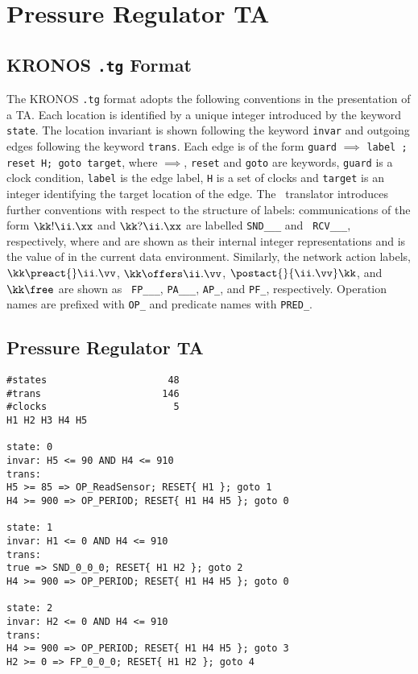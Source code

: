 \twocolumn
\chapter{Pressure Regulator TA}\label{app:pressureta}
{
\tiny
\section{KRONOS {\tt .tg} Format}
The KRONOS {\tt .tg} format adopts the following conventions in the
presentation of a TA. Each location is identified by a unique integer
introduced by the keyword {\tt state}. The location invariant is shown
following the keyword {\tt invar} and outgoing edges following the
keyword {\tt trans}. Each edge is of the form {\tt guard} $\implies$
{\tt label ; reset H; goto target}, where $\implies$, {\tt reset} and
{\tt goto} are keywords, {\tt guard} is a clock condition, {\tt label}
is the edge label, {\tt H} is a set of clocks and {\tt target} is an
integer identifying the target location of the edge. The \bcandle\
translator introduces further conventions with respect to the
structure of labels: communications of the form $\kk!\ii.\xx$ and
$\kk?\ii.\xx$ are labelled {\tt SND\_\kk\_\ii\_\vv} and {\tt
RCV\_\kk\_\ii\_\vv}, respectively, where {\tt \kk} and {\tt \ii} are
shown as their internal integer representations and {\tt \vv} is the
value of {\tt \xx} in the current data environment. Similarly, the
network action labels, $\kk\preact{}\ii.\vv$, $\kk\offers\ii.\vv$,
$\postact{}{\ii.\vv}\kk$, and $\kk\free$ are shown as {\tt
FP\_\kk\_\ii\_\vv}, {\tt PA\_\kk\_\ii\_\vv}, {\tt AP\_\kk},
and {\tt PF\_\kk}, respectively. Operation names are
prefixed with {\tt OP\_} and predicate names with {\tt PRED\_}.

\section{Pressure Regulator TA}
\begin{verbatim}
#states                     48
#trans                     146
#clocks                      5
H1 H2 H3 H4 H5

state: 0
invar: H5 <= 90 AND H4 <= 910
trans: 
H5 >= 85 => OP_ReadSensor; RESET{ H1 }; goto 1
H4 >= 900 => OP_PERIOD; RESET{ H1 H4 H5 }; goto 0

state: 1
invar: H1 <= 0 AND H4 <= 910
trans: 
true => SND_0_0_0; RESET{ H1 H2 }; goto 2
H4 >= 900 => OP_PERIOD; RESET{ H1 H4 H5 }; goto 0

state: 2
invar: H2 <= 0 AND H4 <= 910
trans: 
H4 >= 900 => OP_PERIOD; RESET{ H1 H4 H5 }; goto 3
H2 >= 0 => FP_0_0_0; RESET{ H1 H2 }; goto 4


\end{verbatim}}

